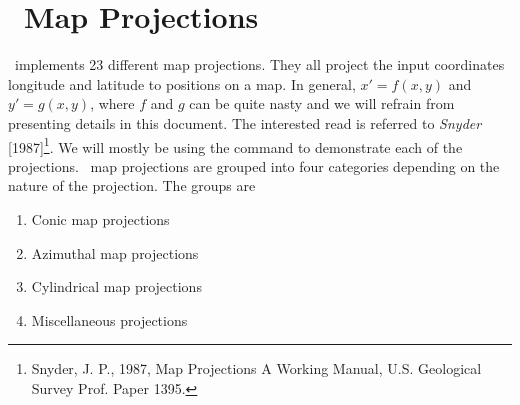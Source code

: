 %
%
\chapter{\gmt\ Map Projections}

\GMT\ implements 23 different map projections.  They all project the input coordinates
longitude and latitude to positions on a map.  In general, $x' = f(x,y)$ and $y' = g(x,y)$, where $f$ and $g$ can be
quite nasty and we will refrain from presenting details in this document.  The interested read is referred to
{\it Snyder} [1987]\footnote{Snyder, J. P., 1987, Map Projections \- A Working Manual, U.S. Geological Survey Prof. Paper 1395.}.
We will mostly be using the  command to demonstrate each of the projections.
\GMT\ map projections are grouped into four categories depending on the
nature of the projection.  The groups are

\begin{enumerate}
\item Conic map projections
\item Azimuthal map projections
\item Cylindrical map projections
\item Miscellaneous projections
\end{enumerate}





